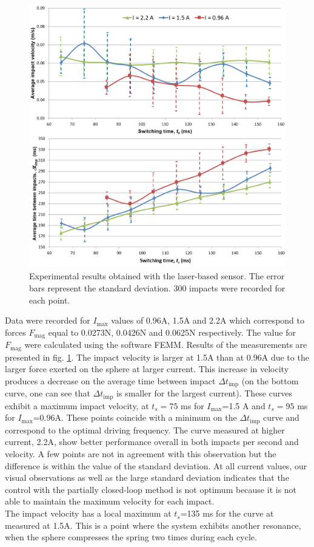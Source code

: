 \documentclass[letterpaper, 10 pt, journal, twoside]{ieeetran}
\begin{document}
\begin{figure}
  \includegraphics[width=\linewidth]{laser_exp.png}
  \caption{Experimental results obtained with the laser-based sensor. The error bars represent the standard deviation. 300 impacts were recorded for each point.}
  \label{laser_exp}
	\vspace{-2em}
\end{figure}

Data were recorded for $I_{\textrm{max}}$ values of 0.96A, 1.5A and 2.2A which correspond to forces $F_{\textrm{mag}}$ equal to 0.0273N, 0.0426N and 0.0625N respectively. The value for $F_{\textrm{mag}}$ were calculated using the software FEMM. Results of the measurements are presented in fig. \ref{laser_exp}. The impact velocity is larger at 1.5A than at 0.96A due to the larger force exerted on the sphere at larger current. This increase in velocity produces a decrease on the average time between impact $\Delta t_{\textrm{imp}}$ (on the bottom curve, one can see that $\Delta t_{\textrm{imp}}$ is smaller for the largest current). These curves exhibit a maximum impact velocity, at $t_s=75$ ms for $I_{\textrm{max}}$=1.5 A and $t_s=95$ ms for $I_{\textrm{max}}$=0.96A. These points coincide with a minimum on the $\Delta t_{\textrm{imp}}$ curve and correspond to the optimal driving frequency. The curve measured at higher current, 2.2A, show better performance overall in both impacts per second and velocity. A few points are not in agreement with this observation but the difference is within the value of the standard deviation. At all current values, our visual observations as well as the large standard deviation indicates that the control with the partially closed-loop method is not optimum because it is not able to maintain the maximum velocity for each impact.\\
The impact velocity has a local maximum at $t_s$=135 ms for the curve at measured at 1.5A. This is a point where the system exhibits another resonance, when the sphere compresses the spring two times during each cycle.
\end{document}

